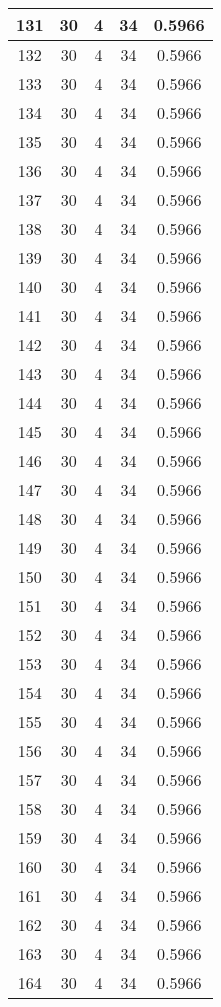 \documentclass[letterpaper, 12pt]{article}
\begin{document}
\begin{longtable}{|c|c|c|c|c|}
\hline
131 & 30 & 4 & 34 & 0.5966 \\
\hline
132 & 30 & 4 & 34 & 0.5966 \\
\hline
133 & 30 & 4 & 34 & 0.5966 \\
\hline
134 & 30 & 4 & 34 & 0.5966 \\
\hline
135 & 30 & 4 & 34 & 0.5966 \\
\hline
136 & 30 & 4 & 34 & 0.5966 \\
\hline
137 & 30 & 4 & 34 & 0.5966 \\
\hline
138 & 30 & 4 & 34 & 0.5966 \\
\hline
139 & 30 & 4 & 34 & 0.5966 \\
\hline
140 & 30 & 4 & 34 & 0.5966 \\
\hline
141 & 30 & 4 & 34 & 0.5966 \\
\hline
142 & 30 & 4 & 34 & 0.5966 \\
\hline
143 & 30 & 4 & 34 & 0.5966 \\
\hline
144 & 30 & 4 & 34 & 0.5966 \\
\hline
145 & 30 & 4 & 34 & 0.5966 \\
\hline
146 & 30 & 4 & 34 & 0.5966 \\
\hline
147 & 30 & 4 & 34 & 0.5966 \\
\hline
148 & 30 & 4 & 34 & 0.5966 \\
\hline
149 & 30 & 4 & 34 & 0.5966 \\
\hline
150 & 30 & 4 & 34 & 0.5966 \\
\hline
151 & 30 & 4 & 34 & 0.5966 \\
\hline
152 & 30 & 4 & 34 & 0.5966 \\
\hline
153 & 30 & 4 & 34 & 0.5966 \\
\hline
154 & 30 & 4 & 34 & 0.5966 \\
\hline
155 & 30 & 4 & 34 & 0.5966 \\
\hline
156 & 30 & 4 & 34 & 0.5966 \\
\hline
157 & 30 & 4 & 34 & 0.5966 \\
\hline
158 & 30 & 4 & 34 & 0.5966 \\
\hline
159 & 30 & 4 & 34 & 0.5966 \\
\hline
160 & 30 & 4 & 34 & 0.5966 \\
\hline
161 & 30 & 4 & 34 & 0.5966 \\
\hline
162 & 30 & 4 & 34 & 0.5966 \\
\hline
163 & 30 & 4 & 34 & 0.5966 \\
\hline
164 & 30 & 4 & 34 & 0.5966 \\

\end{longtable}
\end{document}
